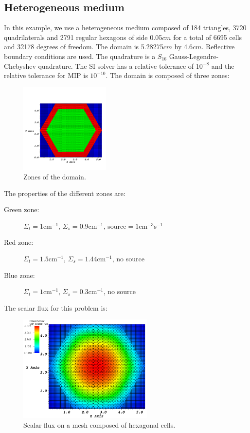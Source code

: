 \subsection{Heterogeneous medium}
In this example, we use a heterogeneous medium composed of 184 triangles, 3720
quadrilaterals and 2791 regular hexagons of side 0.05$cm$ for a total of 6695 
cells and 32178 degrees of freedom. The domain is 5.28275$cm$ by 4.6$cm$. 
Reflective boundary conditions are used. The quadrature is a $S_{16}$ 
Gauss-Legendre-Chebyshev quadrature. The SI solver has a relative tolerance of 
$10^{-8}$ and the relative tolerance for MIP is $10^{-10}$. The domain is 
composed of three zones:
\begin{figure}[H]
\centering
\includegraphics[width=0.4\textwidth]{./Dsa/source_crop}
\caption{Zones of the domain.}
\end{figure}
The properties of the different zones are:
\begin{description}
\item[Green zone:] $\Sigma_t =1$cm$^{-1}$, $\Sigma_s = 0.9$cm$^{-1}$, source$ =
1$cm$^{-3}$s$^{-1}$
\item[Red zone:] $\Sigma_t = 1.5$cm$^{-1}$, $\Sigma_s = 1.44$cm$^{-1}$, no source
\item[Blue zone:] $\Sigma_t = 1$cm$^{-1}$, $\Sigma_s = 0.3$cm$^{-1}$, no source
\end{description}
The scalar flux for this problem is:
\begin{figure}[H]
\centering
\includegraphics[width=0.6\textwidth]{./Dsa/heterog_hex_crop}
\caption{Scalar flux on a mesh composed of hexagonal cells.}
\end{figure}
